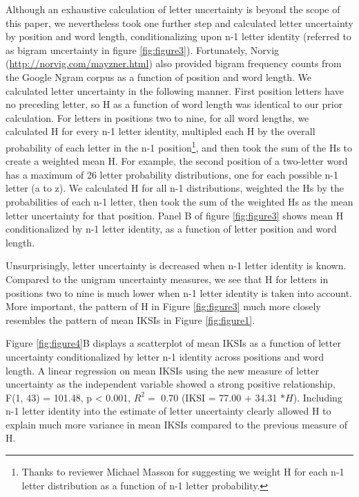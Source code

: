 \documentclass[,man,floatsintext]{apa6}
\let\rmarkdownfootnote\footnote%
\def\footnote{\protect\rmarkdownfootnote}
\begin{document}
Although an exhaustive calculation of letter uncertainty is beyond the scope of this paper, we nevertheless took one further step and calculated letter uncertainty by position and word length, conditionalizing upon n-1 letter identity (referred to as bigram uncertainty in figure \ref{fig:figure3}). Fortunately, Norvig (\url{http://norvig.com/mayzner.html}) also provided bigram frequency counts from the Google Ngram corpus as a function of position and word length. We calculated letter uncertainty in the following manner. First position letters have no preceding letter, so H as a function of word length was identical to our prior calculation. For letters in positions two to nine, for all word lengths, we calculated H for every n-1 letter identity, multipled each H by the overall probability of each letter in the n-1 position\footnote{Thanks to reviewer Michael Masson for suggesting we weight H for each n-1 letter distribution as a function of n-1 letter probability.}, and then took the sum of the Hs to create a weighted mean H. For example, the second position of a two-letter word has a maximum of 26 letter probability distributions, one for each possible n-1 letter (a to z). We calculated H for all n-1 distributions, weighted the Hs by the probabilities of each n-1 letter, then took the sum of the weighted Hs as the mean letter uncertainty for that position. Panel B of figure \ref{fig:figure3} shows mean H conditionalized by n-1 letter identity, as a function of letter position and word length.

Unsurprisingly, letter uncertainty is decreased when n-1 letter identity is known. Compared to the unigram uncertainty measures, we see that H for letters in positions two to nine is much lower when n-1 letter identity is taken into account. More important, the pattern of H in Figure \ref{fig:figure3} much more closely resembles the pattern of mean IKSIs in Figure \ref{fig:figure1}.

Figure \ref{fig:figure4}B displays a scatterplot of mean IKSIs as a function of letter uncertainty conditionalized by letter n-1 identity across positions and word length. A linear regression on mean IKSIs using the new measure of letter uncertainty as the independent variable showed a strong positive relationship, F(1, 43) = 101.48, p \textless{} 0.001, \(R^2 =\) 0.70 (IKSI = 77.00 \(+\) 34.31 \(*H\)). Including n-1 letter identity into the estimate of letter uncertainty clearly allowed H to explain much more variance in mean IKSIs compared to the previous measure of H.
\end{document}
